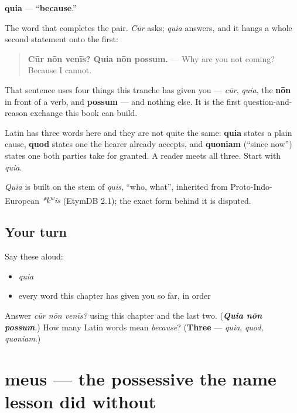 \begin{cousinweb}
\textbf{quia} — \textquotedblleft{}\textbf{because}.\textquotedblright{}

The word that completes the pair. \emph{Cūr} asks; \emph{quia} answers, and it hangs a whole second statement onto the first:

\begin{quote}
\textbf{Cūr nōn venīs? Quia nōn possum.} — Why are you not coming? Because I cannot.
\end{quote}

That sentence uses four things this tranche has given you — \emph{cūr}, \emph{quia}, the \textbf{nōn} in front of a verb, and \textbf{possum} — and nothing else. It is the first question-and-reason exchange this book can build.

Latin has three words here and they are not quite the same: \textbf{quia} states a plain cause, \textbf{quod} states one the hearer already accepts, and \textbf{quoniam} (\textquotedblleft{}since now\textquotedblright{}) states one both parties take for granted. A reader meets all three. Start with \emph{quia}.

\emph{Quia} is built on the stem of \emph{quis}, \textquotedblleft{}who, what\textquotedblright{}, inherited from Proto-Indo-European \emph{*k\textsuperscript{w}is} (EtymDB 2.1); the exact form behind it is disputed.
\end{cousinweb}

\subsection*{Your turn}
Say these aloud:

\begin{itemize}
\raggedright
  \item \emph{quia}
  \item every word this chapter has given you so far, in order
\end{itemize}

\begin{tcolorbox}[breakable,colback=teal!4,colframe=teal!35!black,title={Before you move on}]
Answer \emph{cūr nōn venīs?} using this chapter and the last two. (\emph{\textbf{Quia nōn possum}}.) How many Latin words mean \emph{because}? (\textbf{Three} — \emph{quia}, \emph{quod}, \emph{quoniam}.)
\end{tcolorbox}
\section[meus, mea, meum]{meus — the possessive the name lesson did without}


